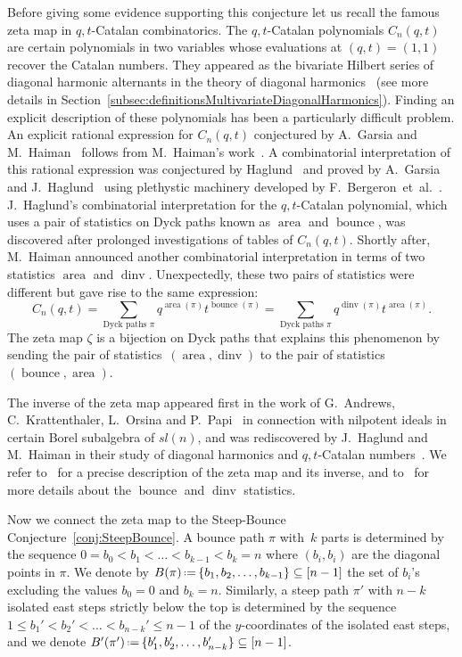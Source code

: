 \documentclass{amsart}
\theoremstyle{definition}
\newcommand{\eqdef}{\mbox{\,\raisebox{0.2ex}{\scriptsize\ensuremath{\mathrm:}}\ensuremath{=}\,}} %
\newcommand{\area}{\operatorname{area}} %
\newcommand{\dinv}{\operatorname{dinv}} %
\newcommand{\bounce}{\operatorname{bounce}} %
\begin{document}
Before giving some evidence supporting this conjecture let us recall the famous zeta map in $q,t$-Catalan combinatorics.
The $q,t$-Catalan polynomials $C_n(q,t)$ are certain polynomials in two variables whose evaluations at $(q,t)=(1,1)$ recover the Catalan numbers.
They appeared as the bivariate Hilbert series of diagonal harmonic alternants in the theory of diagonal harmonics~\cite{Haglund-qt-catalan} 
(see more details in Section~\ref{subsec:definitionsMultivariateDiagonalHarmonics}).
Finding an explicit description of these polynomials has been a particularly difficult problem.
An explicit rational expression for $C_n(q,t)$ conjectured by A.~Garsia and M.~Haiman~\cite{GarsiaHaiman-remarkableCatalanSequence} 
follows from M.~Haiman's work~\cite{Haiman-vanishingTheorems}. A combinatorial interpretation of this rational expression was conjectured by 
Haglund~\cite{haglund_conjectured_2003} and proved by A.~Garsia and J.~Haglund~\cite{garsia_proof_2002} using plethystic  machinery developed by F.~Bergeron~et~al.~\cite{bergeron_identities_1999}. 
J.~Haglund's combinatorial interpretation for the $q,t$-Catalan polynomial, which uses a pair of statistics on Dyck paths known as $\area$ and $\bounce$, was discovered after prolonged investigations of tables of $C_n(q,t)$. Shortly after, M.~Haiman announced another combinatorial interpretation in terms of two statistics $\area$ and $\dinv$. Unexpectedly, these two pairs of statistics were different but gave rise to the same expression:
\[
C_n(q,t) = \sum_{\text{Dyck paths }\pi} q^{\area(\pi)} t^{\bounce(\pi)}
= \sum_{\text{Dyck paths }\pi} q^{\dinv(\pi)} t^{\area(\pi)}.
\]
The zeta map $\zeta$ is a bijection on Dyck paths that explains this phenomenon by sending the pair of statistics~$(\area,\dinv)$ to the pair of statistics~$(\bounce,\area)$.

The inverse of the zeta map appeared first in the work of G.~Andrews, C.~Krattenthaler, L.~Orsina and P.~Papi~\cite{AndrewsKrattenthalerOrsinaPapi} in connection with nilpotent ideals in certain Borel subalgebra of $sl(n)$, and was rediscovered by J.~Haglund and M.~Haiman in their study of diagonal harmonics and $q,t$-Catalan numbers~\cite{Haglund-qt-catalan}.
We refer to~\cite[Proof of Theorem~3.15]{Haglund-qt-catalan} for a precise description of the zeta map and its inverse, and to~\cite[Chapt.~3]{Haglund-qt-catalan} for more details about the $\bounce$ and $\dinv$ statistics.

Now we connect the zeta map to the Steep-Bounce Conjecture~\ref{conj:SteepBounce}.
A bounce path $\pi$ with~$k$ parts is determined by the sequence $0=b_0<b_1<\dots<b_{k-1}<b_k=n$ where $(b_i,b_i)$ are the diagonal points in $\pi$. 
We denote by $B(\pi) \eqdef \{b_1,b_2,\dots,b_{k-1}\} \subseteq [n-1]$ the set of $b_i$'s excluding the values $b_0=0$ and $b_k=n$. 
Similarly, a steep path $\pi'$ with $n-k$ isolated east steps strictly below the top is determined by the sequence $1\leq b_1' < b_2' < \dots < b_{n-k}' \leq n-1$ 
of the $y$-coordinates of the isolated east steps, and we denote
$B'(\pi') \eqdef \{b_1',b_2',\dots,b_{n-k}'\} \subseteq [n-1]$. 
\end{document}
